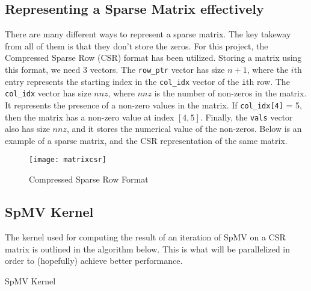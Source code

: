 \documentclass{article}
\begin{document}
    \subsection{Representing a Sparse Matrix effectively}
    There are many different ways to represent a sparse matrix. The key takeway from all of them is that they don't store the zeros. For this project, the Compressed Sparse Row (CSR) format  has been utilized. Storing a matrix using this format, we need 3 vectors. The \texttt{row\_ptr} vector has size \( n + 1 \), where the \( i \)th entry represents the starting index in the \texttt{col\_idx} vector of the \texttt{i}th row. The \texttt{col\_idx} vector has size \( nnz \), where \( nnz \) is the number of non-zeros in the matrix. It represents the presence of a non-zero values in the matrix. If \texttt{col\_idx[4]} = 5, then the matrix has a non-zero value at index \( [4,5] \). Finally, the \texttt{vals} vector also has size \( nnz \), and it stores the numerical value of the non-zeros. Below is an example of a sparse matrix, and the CSR representation of the same matrix.

    \begin{figure}[H]
        \centering
            \texttt{[image: matrixcsr]}
        \caption{Compressed Sparse Row Format}
    \end{figure}

    \newpage
    \subsection{SpMV Kernel}

    The kernel used for computing the result of an iteration of SpMV on a CSR matrix is outlined in the algorithm below. This is what will be parallelized in order to (hopefully) achieve better performance.
    \medskip

    \begin{algorithm}[H]
        \caption{SpMV Kernel}
        \SetAlgoVlined

    \end{algorithm}
\end{document}
